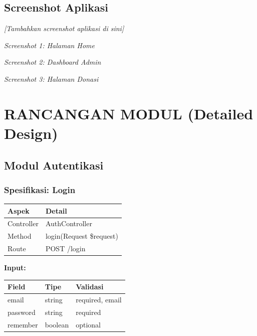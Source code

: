 \documentclass[12pt,a4paper]{article}
\begin{document}
\subsection{Screenshot Aplikasi}

\textit{[Tambahkan screenshot aplikasi di sini]}

\vspace{5cm}

\textit{Screenshot 1: Halaman Home}

\vspace{5cm}

\textit{Screenshot 2: Dashboard Admin}

\vspace{5cm}

\textit{Screenshot 3: Halaman Donasi}

\newpage

\section{RANCANGAN MODUL (Detailed Design)}

\subsection{Modul Autentikasi}

\subsubsection{Spesifikasi: Login}
\begin{table}[h]
\centering
\begin{tabular}{|l|l|}
\hline
\textbf{Aspek} & \textbf{Detail} \\
\hline
Controller & AuthController \\
Method & login(Request \$request) \\
Route & POST /login \\
\hline
\end{tabular}
\end{table}

\textbf{Input:}
\begin{table}[h]
\centering
\begin{tabular}{|l|l|l|}
\hline
\textbf{Field} & \textbf{Tipe} & \textbf{Validasi} \\
\hline
email & string & required, email \\
password & string & required \\
remember & boolean & optional \\
\hline
\end{tabular}
\end{table}
\end{document}
